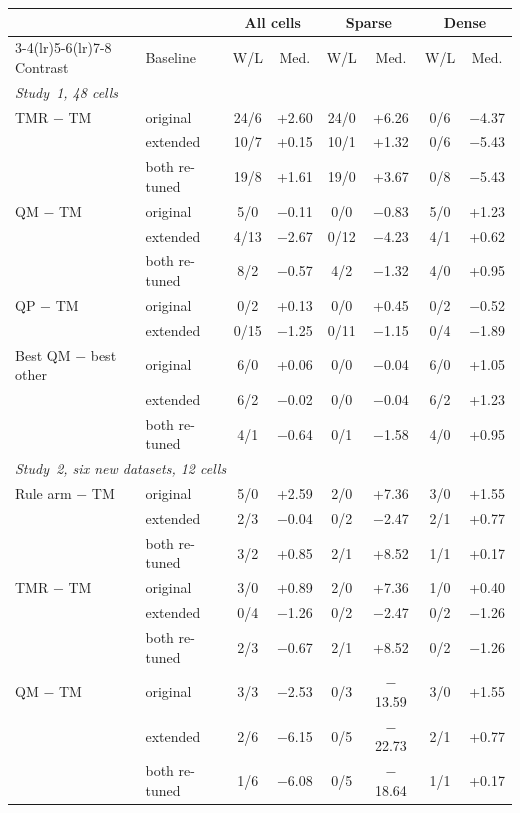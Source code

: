 \begin{tabular}{llcccccc}
\toprule
 & & \multicolumn{2}{c}{All cells} & \multicolumn{2}{c}{Sparse} & \multicolumn{2}{c}{Dense} \\
\cmidrule(lr){3-4}\cmidrule(lr){5-6}\cmidrule(lr){7-8}
Contrast & Baseline & W/L & Med. & W/L & Med. & W/L & Med. \\
\midrule
\multicolumn{8}{l}{\emph{Study~1, 48 cells}} \\
TMR $-$ TM & original & 24/6 & +2.60 & 24/0 & +6.26 & 0/6 & $-$4.37 \\
 & extended & 10/7 & +0.15 & 10/1 & +1.32 & 0/6 & $-$5.43 \\
 & {\color{blue}both re-tuned} & {\color{blue}19/8} & {\color{blue}+1.61} & {\color{blue}19/0} & {\color{blue}+3.67} & {\color{blue}0/8} & {\color{blue}$-$5.43} \\
QM $-$ TM & original & 5/0 & $-$0.11 & 0/0 & $-$0.83 & 5/0 & +1.23 \\
 & extended & 4/13 & $-$2.67 & 0/12 & $-$4.23 & 4/1 & +0.62 \\
 & {\color{blue}both re-tuned} & {\color{blue}8/2} & {\color{blue}$-$0.57} & {\color{blue}4/2} & {\color{blue}$-$1.32} & {\color{blue}4/0} & {\color{blue}+0.95} \\
QP $-$ TM & original & 0/2 & +0.13 & 0/0 & +0.45 & 0/2 & $-$0.52 \\
 & extended & 0/15 & $-$1.25 & 0/11 & $-$1.15 & 0/4 & $-$1.89 \\
Best QM $-$ best other & original & 6/0 & +0.06 & 0/0 & $-$0.04 & 6/0 & +1.05 \\
 & extended & 6/2 & $-$0.02 & 0/0 & $-$0.04 & 6/2 & +1.23 \\
 & {\color{blue}both re-tuned} & {\color{blue}4/1} & {\color{blue}$-$0.64} & {\color{blue}0/1} & {\color{blue}$-$1.58} & {\color{blue}4/0} & {\color{blue}+0.95} \\
\midrule
\multicolumn{8}{l}{\emph{Study~2, six new datasets, 12 cells}} \\
Rule arm $-$ TM & original & 5/0 & +2.59 & 2/0 & +7.36 & 3/0 & +1.55 \\
 & extended & 2/3 & $-$0.04 & 0/2 & $-$2.47 & 2/1 & +0.77 \\
 & {\color{blue}both re-tuned} & {\color{blue}3/2} & {\color{blue}+0.85} & {\color{blue}2/1} & {\color{blue}+8.52} & {\color{blue}1/1} & {\color{blue}+0.17} \\
TMR $-$ TM & original & 3/0 & +0.89 & 2/0 & +7.36 & 1/0 & +0.40 \\
 & extended & 0/4 & $-$1.26 & 0/2 & $-$2.47 & 0/2 & $-$1.26 \\
 & {\color{blue}both re-tuned} & {\color{blue}2/3} & {\color{blue}$-$0.67} & {\color{blue}2/1} & {\color{blue}+8.52} & {\color{blue}0/2} & {\color{blue}$-$1.26} \\
QM $-$ TM & original & 3/3 & $-$2.53 & 0/3 & $-$13.59 & 3/0 & +1.55 \\
 & extended & 2/6 & $-$6.15 & 0/5 & $-$22.73 & 2/1 & +0.77 \\
 & {\color{blue}both re-tuned} & {\color{blue}1/6} & {\color{blue}$-$6.08} & {\color{blue}0/5} & {\color{blue}$-$18.64} & {\color{blue}1/1} & {\color{blue}+0.17} \\
\bottomrule
\end{tabular}
